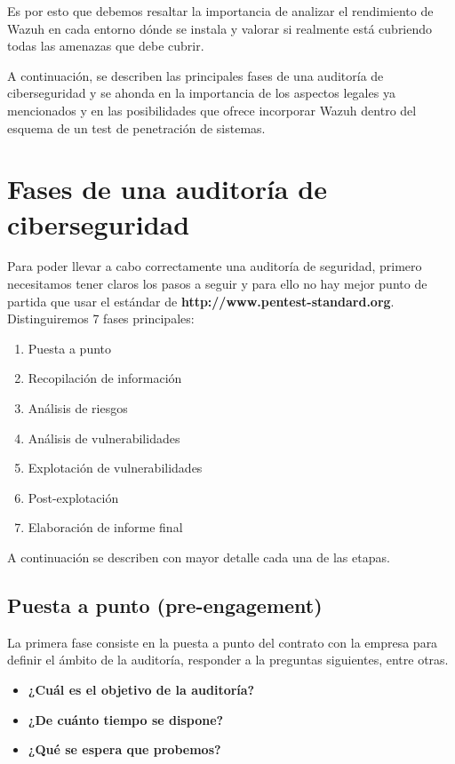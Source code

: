 Es por esto que debemos resaltar la importancia de analizar el rendimiento de Wazuh en cada entorno dónde se instala y valorar si realmente está cubriendo todas las amenazas que debe cubrir.

A continuación, se describen las principales fases de una auditoría de ciberseguridad y se ahonda en la importancia de los aspectos legales ya mencionados y en las posibilidades que ofrece incorporar Wazuh dentro del esquema de un test de penetración de sistemas.


\section{Fases de una auditoría de ciberseguridad}

Para poder llevar a cabo correctamente una auditoría de seguridad, primero necesitamos tener claros los pasos a seguir y para ello no hay mejor punto de partida que usar el estándar de \textbf{http://www.pentest-standard.org}. Distinguiremos 7 fases principales:
\begin{enumerate}
    \item Puesta a punto
    \item Recopilación de información
    \item Análisis de riesgos
    \item Análisis de vulnerabilidades
    \item Explotación de vulnerabilidades
    \item Post-explotación
    \item Elaboración de informe final
\end{enumerate}

A continuación se describen con mayor detalle cada una de las etapas.

\subsection{Puesta a punto (pre-engagement)}

La primera fase consiste en la puesta a punto del contrato con la empresa para definir el ámbito de la auditoría, responder a la preguntas siguientes, entre otras.

\begin{itemize}
    \item \textbf{¿Cuál es el objetivo de la auditoría?}
    \item \textbf{¿De cuánto tiempo se dispone?}
    \item \textbf{¿Qué se espera que probemos?} 
\end{itemize} 

